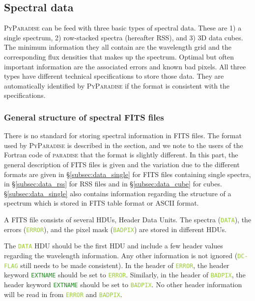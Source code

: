 \documentclass[usenatbib,usegraphicx,useAMS,onecolumn]{mn2e}
\newcommand{\codeline}[1]{\lstinline|#1|}
\newcommand{\headerkw}[1]{\textcolor{ForestGreen}{\codeline{#1}}}
\newcommand{\headerval}[1]{\textcolor{YellowGreen}{\codeline{#1}}}
\begin{document}
\subsection{Spectral data}
\label{subsec:data_multidim}
\textsc{PyParadise} can be feed with three basic types of spectral data.
These are 1) a single spectrum, 2) row-stacked spectra (hereafter RSS), and 3) 3D data cubes.
The minimum information they all contain are the wavelength grid and the corresponding flux densities that makes up the spectrum.
Optimal but often important information are the associated errors and known bad pixels.
All three types have different technical specifications to store those data.
They are automatically identified by \textsc{PyParadise} if the format is consistent with the specifications.

\subsubsection{General structure of spectral FITS files}
There is no standard for storing spectral information in FITS files.
The format used by \textsc{PyParadise} is described in the section, and we note to the users of the Fortran code of \textsc{paradise} that the format is slightly different.
In this part, the general description of FITS files is given and the variation due to the different formats are given in \S\ref{subsec:data_single} for FITS files containing single spectra, in \S\ref{subsec:data_rss} for RSS files and in \S\ref{subsec:data_cube} for cubes.
\S\ref{subsec:data_single} also contains information regarding the structure of a spectrum which is stored in FITS table format or ASCII format.

A FITS file consists of several HDUs, Header Data Units.
The spectra (\headerval{DATA}), the errors (\headerval{ERROR}), and the pixel mask (\headerval{BADPIX}) are stored in different HDUs.

The \headerval{DATA} HDU should be the first HDU and include a few header values regarding the wavelength information.
Any other information is not ignored (\headerval{DC-FLAG} still needs to be made consistent).
In the header of \headerval{ERROR}, the header keyword \headerkw{EXTNAME} should be set to \headerval{ERROR}.
Similarly, in the header of \headerval{BADPIX}, the header keyword \headerkw{EXTNAME} should be set to \headerval{BADPIX}.
No other header information will be read in from \headerval{ERROR} and \headerval{BADPIX}.
\end{document}

